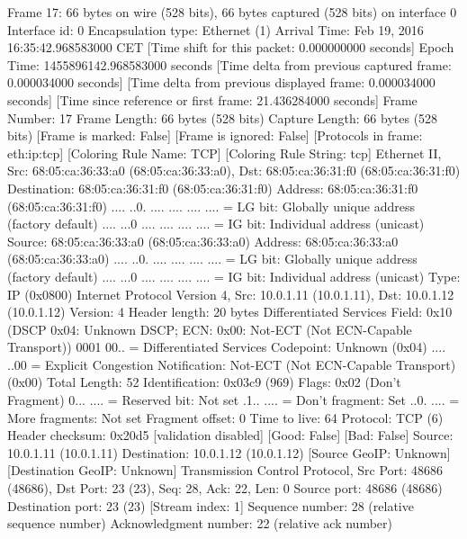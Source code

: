 Frame 17: 66 bytes on wire (528 bits), 66 bytes captured (528 bits) on interface 0
    Interface id: 0
    Encapsulation type: Ethernet (1)
    Arrival Time: Feb 19, 2016 16:35:42.968583000 CET
    [Time shift for this packet: 0.000000000 seconds]
    Epoch Time: 1455896142.968583000 seconds
    [Time delta from previous captured frame: 0.000034000 seconds]
    [Time delta from previous displayed frame: 0.000034000 seconds]
    [Time since reference or first frame: 21.436284000 seconds]
    Frame Number: 17
    Frame Length: 66 bytes (528 bits)
    Capture Length: 66 bytes (528 bits)
    [Frame is marked: False]
    [Frame is ignored: False]
    [Protocols in frame: eth:ip:tcp]
    [Coloring Rule Name: TCP]
    [Coloring Rule String: tcp]
Ethernet II, Src: 68:05:ca:36:33:a0 (68:05:ca:36:33:a0), Dst: 68:05:ca:36:31:f0 (68:05:ca:36:31:f0)
    Destination: 68:05:ca:36:31:f0 (68:05:ca:36:31:f0)
        Address: 68:05:ca:36:31:f0 (68:05:ca:36:31:f0)
        .... ..0. .... .... .... .... = LG bit: Globally unique address (factory default)
        .... ...0 .... .... .... .... = IG bit: Individual address (unicast)
    Source: 68:05:ca:36:33:a0 (68:05:ca:36:33:a0)
        Address: 68:05:ca:36:33:a0 (68:05:ca:36:33:a0)
        .... ..0. .... .... .... .... = LG bit: Globally unique address (factory default)
        .... ...0 .... .... .... .... = IG bit: Individual address (unicast)
    Type: IP (0x0800)
Internet Protocol Version 4, Src: 10.0.1.11 (10.0.1.11), Dst: 10.0.1.12 (10.0.1.12)
    Version: 4
    Header length: 20 bytes
    Differentiated Services Field: 0x10 (DSCP 0x04: Unknown DSCP; ECN: 0x00: Not-ECT (Not ECN-Capable Transport))
        0001 00.. = Differentiated Services Codepoint: Unknown (0x04)
        .... ..00 = Explicit Congestion Notification: Not-ECT (Not ECN-Capable Transport) (0x00)
    Total Length: 52
    Identification: 0x03c9 (969)
    Flags: 0x02 (Don't Fragment)
        0... .... = Reserved bit: Not set
        .1.. .... = Don't fragment: Set
        ..0. .... = More fragments: Not set
    Fragment offset: 0
    Time to live: 64
    Protocol: TCP (6)
    Header checksum: 0x20d5 [validation disabled]
        [Good: False]
        [Bad: False]
    Source: 10.0.1.11 (10.0.1.11)
    Destination: 10.0.1.12 (10.0.1.12)
    [Source GeoIP: Unknown]
    [Destination GeoIP: Unknown]
Transmission Control Protocol, Src Port: 48686 (48686), Dst Port: 23 (23), Seq: 28, Ack: 22, Len: 0
    Source port: 48686 (48686)
    Destination port: 23 (23)
    [Stream index: 1]
    Sequence number: 28    (relative sequence number)
    Acknowledgment number: 22    (relative ack number)
